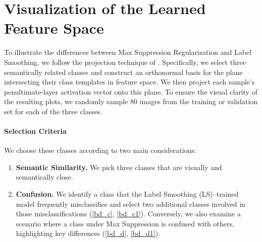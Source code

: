 \section{Visualization of the Learned Feature Space} 
\label{sec:vis_feature}
To illustrate the differences between Max Suppression Regularization and Label Smoothing, we follow the projection technique of \citet{muller2019does}. Specifically, we select three semantically related classes and construct an orthonormal basis for the plane intersecting their class templates in feature space. We then project each sample’s penultimate-layer activation vector onto this plane. To ensure the visual clarity of the resulting plots, we randomly sample 80 images from the training or validation set for each of the three classes.

\paragraph{Selection Criteria}
We choose these classes according to two main considerations:
\begin{enumerate}
    \item \textbf{Semantic Similarity.} We pick three classes that are visually and semantically close.
    \item \textbf{Confusion.} We identify a class that the Label Smoothing (LS)–trained model frequently misclassifies and select two additional classes involved in those misclassifications (\cref{bd_c}, \cref{bd_c1}). Conversely, we also examine a scenario where a class under Max Suppression is confused with others, highlighting key differences (\cref{bd_d}, \cref{bd_d1}).
\end{enumerate}


